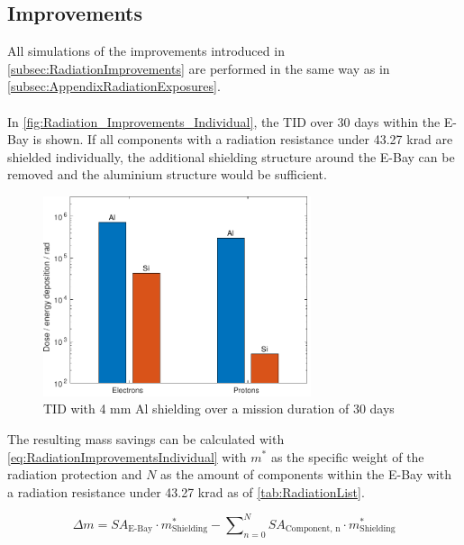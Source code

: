 \newpage

\subsection{Improvements}

\label{app:AppendixRadiationImprovements}

All simulations of the improvements introduced in \autoref{subsec:RadiationImprovements} are performed in the same way as in \autoref{subsec:AppendixRadiationExposures}. \\ \\
In \autoref{fig:Radiation_Improvements_Individual}, the TID over 30 days within the E-Bay is shown. If all components with a radiation resistance under 43.27 krad are shielded individually, the additional shielding structure around the E-Bay can be removed and the aluminium structure would be sufficient.

\begin{figure}[htp]
	\centering
	\includegraphics[width=0.7\textwidth]{Media/J_Improvements_Individual}
	\caption{TID with 4 mm Al shielding over a mission duration of 30 days}
	\label{fig:Radiation_Improvements_Individual}
\end{figure}

The resulting mass savings can be calculated with \autoref{eq:RadiationImprovementsIndividual} with \(m^*\) as the specific weight of the radiation protection and \(N\) as the amount of components within the E-Bay with a radiation resistance under 43.27 krad as of \autoref{tab:RadiationList}.

\begin{equation}
	\Delta m = SA_\text{E-Bay} \cdot m^*_\text{Shielding} - \sum\nolimits_{n=0}^N SA_\text{Component, n} \cdot m^*_\text{Shielding}
	\label{eq:RadiationImprovementsIndividual}
\end{equation}

